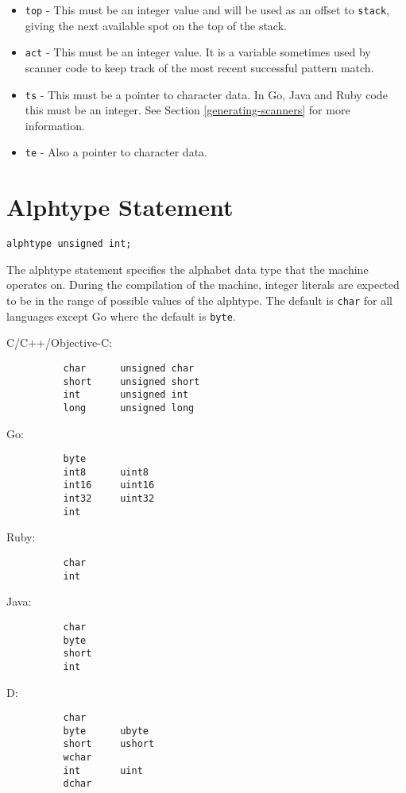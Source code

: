 \documentclass[letterpaper,11pt,oneside]{book}
\newcommand{\verbspace}{\vspace{10pt}}
\begin{document}
\begin{itemize}
\item \verb|top| - This must be an integer value and will be used as an offset
to \verb|stack|, giving the next available spot on the top of the stack.

\item \verb|act| - This must be an integer value. It is a variable sometimes
used by scanner code to keep track of the most recent successful pattern match.

\item \verb|ts| - This must be a pointer to character data. In Go, Java and
Ruby code this must be an integer. See Section \ref{generating-scanners} for
more information.

\item \verb|te| - Also a pointer to character data.

\end{itemize}

\section{Alphtype Statement}

\begin{verbatim}
alphtype unsigned int;
\end{verbatim}
\verbspace

The alphtype statement specifies the alphabet data type that the machine
operates on. During the compilation of the machine, integer literals are
expected to be in the range of possible values of the alphtype. The default
is \verb|char| for all languages except Go where the default is \verb|byte|.

\begin{multicols}{2}
\setlength{\columnseprule}{1pt} 
C/C++/Objective-C:
\begin{verbatim}
          char      unsigned char      
          short     unsigned short
          int       unsigned int
          long      unsigned long
\end{verbatim}

Go:
\begin{verbatim}
          byte
          int8      uint8
          int16     uint16
          int32     uint32
          int
\end{verbatim}

Ruby: 
\begin{verbatim}
          char 
          int
\end{verbatim}

\columnbreak

Java:
\begin{verbatim}
          char 
          byte 
          short 
          int
\end{verbatim}

D:
\begin{verbatim}
          char 
          byte      ubyte   
          short     ushort 
          wchar 
          int       uint 
          dchar
\end{verbatim}

\end{multicols}
\end{document}
